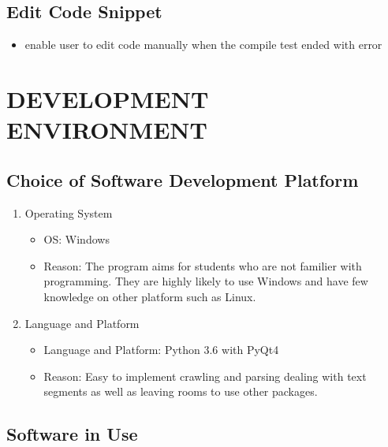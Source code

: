 \documentclass[conference]{IEEEtran}
\begin{document}
\subsection{Edit Code Snippet}
  \begin{itemize}
    \item enable user to edit code manually when the compile test ended with error
  \end{itemize}
\textit{ }


\section{DEVELOPMENT ENVIRONMENT} %
\label{sec:development_environment}
\subsection{Choice of Software Development Platform} %
\label{sub:choice_of_software_development_platform}

\begin{enumerate}
  \item Operating System
  \begin{itemize}
    \item OS: Windows
    \item Reason: The program aims for students who are not familier with programming. They are highly likely to use Windows and have few knowledge on other platform such as Linux.
  \end{itemize}
  \item Language and Platform
  \begin{itemize}
    \item Language and Platform: Python 3.6 with PyQt4
    \item Reason: Easy to implement crawling and parsing dealing with text segments as well as leaving rooms to use other packages.
  \end{itemize}
\end{enumerate}
\textit{}


\subsection{Software in Use} %
\label{sub:software_in_use}
\end{document}
